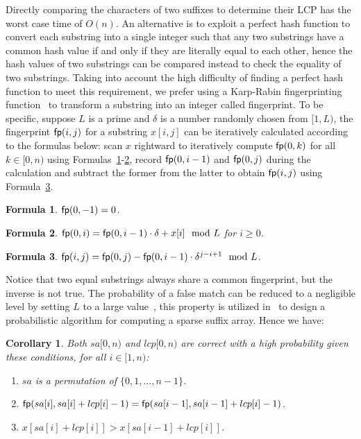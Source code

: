 \documentclass[10pt,journal,compsoc]{IEEEtran}
\newtheorem{Formula}{Formula}
\newtheorem{Corollary}{Corollary}
\begin{document}
Directly comparing the characters of two suffixes to determine their LCP has the worst case time of $O(n)$. An alternative is to exploit a perfect hash function to convert each substring into a single integer such that any two substrings have a common hash value if and only if they are literally equal to each other, hence the hash values of two substrings can be compared instead to check the equality of two substrings. Taking into account the high difficulty of finding a perfect hash function to meet this requirement, we prefer using a Karp-Rabin fingerprinting function~\cite{Karp1987} to transform a substring into an integer called fingerprint. To be specific, suppose $L$ is a prime and $\delta$ is a number randomly chosen from $[1, L)$, the fingerprint ${\sf fp}(i, j)$ for a substring $x[i, j]$ can be iteratively calculated according to the formulas below: scan $x$ rightward to iteratively compute ${\sf fp}(0, k)$ for all $k \in [0, n)$ using Formulas~\ref{formula:1}-\ref{formula:2}, record ${\sf fp}(0, i - 1)$ and ${\sf fp}(0, j)$ during the calculation and subtract the former from the latter to obtain ${\sf fp}(i, j)$ using Formula~\ref{formula:3}.


\begin{Formula} \label{formula:1}
	${\sf fp}(0, -1) = 0$.
	
\end{Formula}

\begin{Formula} \label{formula:2}	
	${\sf fp}(0, i) = {\sf fp}(0, i - 1) \cdot {\delta} + x[i]\mod L$ for $i \ge 0$.
	
\end{Formula}

\begin{Formula} \label{formula:3}
	${\sf fp}(i, j) = {\sf fp}(0, j) - {\sf fp}(0 ,i - 1) \cdot {\delta}^{j - i + 1}\mod L$.
	
\end{Formula}


Notice that two equal substrings always share a common fingerprint, but the inverse is not true. The probability of a false match can be reduced to a negligible level by setting $L$ to a large value~\cite{Karp1987}, this property is utilized in~\cite{Bille2013} to design a probabilistic algorithm for computing a sparse suffix array. Hence we have:


\begin{Corollary} \label{corollary:1}
	Both $sa[0, n)$ and $lcp[0, n)$ are correct with a high probability given these conditions, for all $i \in [1, n)$:
	
	\begin{enumerate}[(1)]
		\item
		$sa$ is a permutation of $\{0, 1, \dots, n - 1\}$.
		
		\item
		${\sf fp}(sa[i], sa[i] + lcp[i] - 1) = {\sf fp}(sa[i - 1], sa[i - 1] + lcp[i] - 1)$.
		
		\item
		$x[sa[i] + lcp[i]] > x[sa[i - 1] + lcp[i]]$.
	\end{enumerate}
\end{Corollary}
\end{document}
